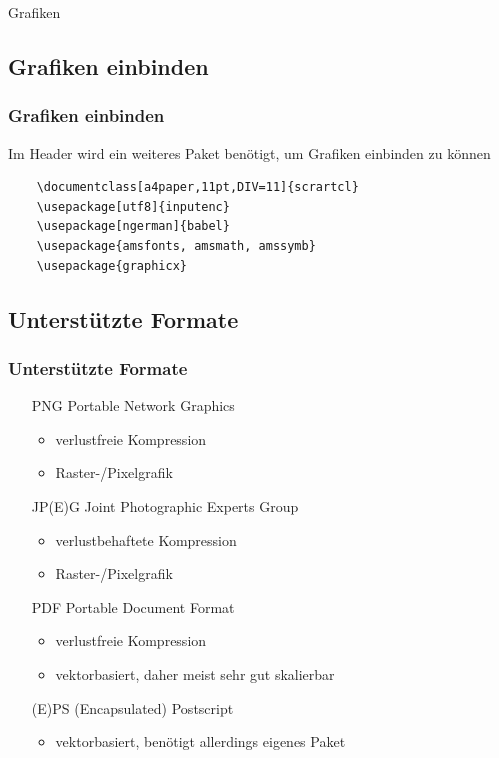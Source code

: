 \begin{frame}
 \begin{center}
  \Huge Grafiken
 \end{center}
\end{frame}

\subsection{Grafiken einbinden}
\begin{frame}[fragile]
\frametitle{Grafiken einbinden}
  Im Header wird ein weiteres Paket benötigt, um Grafiken
einbinden zu können \\
\begin{codeblock}
\begin{small}
\begin{verbatim}
    \documentclass[a4paper,11pt,DIV=11]{scrartcl}
    \usepackage[utf8]{inputenc}
    \usepackage[ngerman]{babel}
    \usepackage{amsfonts, amsmath, amssymb}
    \usepackage{graphicx}
\end{verbatim}
\end{small}
\end{codeblock}
\end{frame}

\subsection{Unterstützte Formate}
\begin{frame}
\frametitle{Unterstützte Formate}
  \begin{itemize}
    \item[PNG] Portable Network Graphics
    \begin{itemize}
      \item verlustfreie Kompression
      \item Raster-/Pixelgrafik
    \end{itemize}
    \item[JP(E)G] Joint Photographic Experts Group
    \begin{itemize}
      \item verlustbehaftete Kompression
      \item Raster-/Pixelgrafik
    \end{itemize}
    \item[PDF] Portable Document Format
    \begin{itemize}
      \item verlustfreie Kompression
      \item vektorbasiert, daher meist sehr gut skalierbar
    \end{itemize}
    \item[(E)PS] (Encapsulated) Postscript
    \begin{itemize}
      \item vektorbasiert, benötigt allerdings eigenes Paket
    \end{itemize}
  \end{itemize}
\end{frame}

